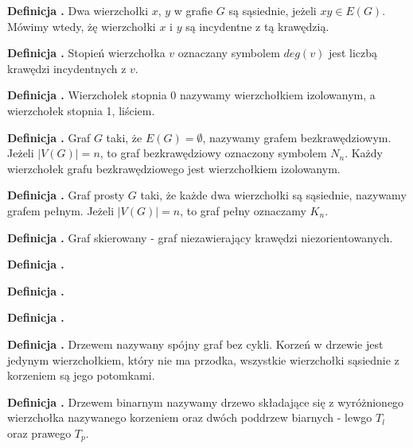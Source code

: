 \noindent
\textbf{Definicja \graphDefinitionIndex.}
\incrementGraphDefinitionIndex
Dwa wierzchołki $x$, $y$ w grafie $G$ są sąsiednie, jeżeli $xy \in E(G)$.
Mówimy wtedy, żę wierzchołki $x$ i $y$ są incydentne z tą krawędzią.

\noindent
\textbf{Definicja \graphDefinitionIndex.}
\incrementGraphDefinitionIndex
Stopień wierzchołka $v$ oznaczany symbolem $deg(v)$ jest liczbą krawędzi incydentnych z $v$.

\noindent
\textbf{Definicja \graphDefinitionIndex.}
\incrementGraphDefinitionIndex
Wierzchołek stopnia 0 nazywamy wierzchołkiem izolowanym, a wierzchołek stopnia 1, liściem.

\noindent
\textbf{Definicja \graphDefinitionIndex.}
\incrementGraphDefinitionIndex
Graf $G$ taki, że $E(G) = \emptyset$, nazywamy grafem bezkrawędziowym. Jeżeli $|V(G)| = n$, to graf bezkrawędziowy oznaczony symbolem $N_n$.
Każdy wierzchołek grafu bezkrawędziowego jest wierzchołkiem izolowanym.

\noindent
\textbf{Definicja \graphDefinitionIndex.}
\incrementGraphDefinitionIndex
Graf prosty $G$ taki, że każde dwa wierzchołki są sąsiednie, nazywamy grafem pełnym.
Jeżeli $|V(G)| = n$, to graf pełny oznaczamy $K_n$.

\noindent
\textbf{Definicja \graphDefinitionIndex.}
\incrementGraphDefinitionIndex
Graf skierowany - graf niezawierający krawędzi niezorientowanych.

\noindent
\textbf{Definicja \graphDefinitionIndex.}
\incrementGraphDefinitionIndex

\noindent
\textbf{Definicja \graphDefinitionIndex.}
\incrementGraphDefinitionIndex

\noindent
\textbf{Definicja \graphDefinitionIndex.}
\incrementGraphDefinitionIndex

\noindent
\textbf{Definicja \graphDefinitionIndex.}
\incrementGraphDefinitionIndex
Drzewem nazywany spójny graf bez cykli. Korzeń w drzewie jest jedynym wierzchołkiem,
który nie ma przodka, wszystkie wierzchołki sąsiednie z korzeniem są jego potomkami.

\noindent
\textbf{Definicja \graphDefinitionIndex.}
\incrementGraphDefinitionIndex
Drzewem binarnym nazywamy drzewo składające się z wyróżnionego wierzchołka nazywanego korzeniem oraz dwóch poddrzew biarnych
- lewgo $T_l$ oraz prawego $T_p$.
